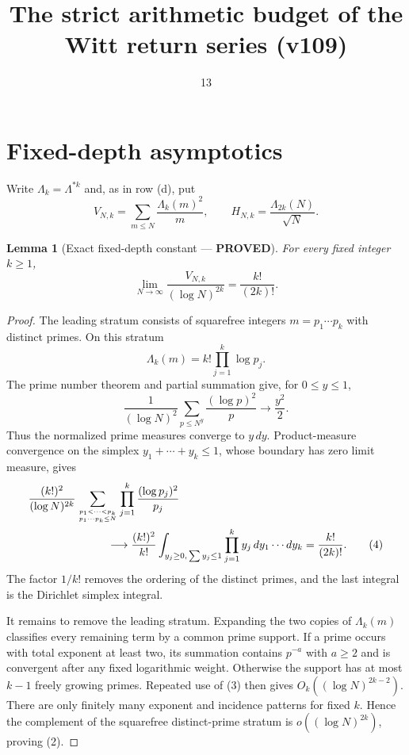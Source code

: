 \documentclass[11pt]{article}
\title{The strict arithmetic budget of the Witt return series (v109)}
\date{13}
\newcommand{\PROVED}{\textcolor{green!40!black}{\textbf{PROVED}}}
\newtheorem{lemma}{Lemma}
\begin{document}
\maketitle

\section{Fixed-depth asymptotics}

Write $\Lambda_k=\Lambda^{*k}$ and, as in row (d), put
\begin{equation}
 V_{N,k}=\sum_{m\le N}\frac{\Lambda_k(m)^2}{m},
 \qquad H_{N,k}=\frac{\Lambda_{2k}(N)}{\sqrt N}.                \tag{1}
\end{equation}

\begin{lemma}[Exact fixed-depth constant --- \PROVED]
For every fixed integer $k\ge1$,
\begin{equation}
 \boxed{
 \lim_{N\to\infty}\frac{V_{N,k}}{(\log N)^{2k}}
       =\frac{k!}{(2k)!}.}                                    \tag{2}
\end{equation}
\end{lemma}

\begin{proof}
The leading stratum consists of squarefree integers
$m=p_1\cdots p_k$ with distinct primes.  On this stratum
\[
 \Lambda_k(m)=k!\prod_{j=1}^k\log p_j.
\]
The prime number theorem and partial summation give, for $0\le y\le1$,
\begin{equation}
 \frac1{(\log N)^2}\sum_{p\le N^y}\frac{(\log p)^2}{p}
       \longrightarrow\frac{y^2}{2}.                          \tag{3}
\end{equation}
Thus the normalized prime measures converge to $y\,dy$.  Product-measure
convergence on the simplex $y_1+\cdots+y_k\le1$, whose boundary has zero
limit measure, gives
\begin{align*}
 &\frac{(k!)^2}{(\log N)^{2k}}
 \sum_{p_1<\cdots<p_k\atop p_1\cdots p_k\le N}
       \prod_{j=1}^k\frac{(\log p_j)^2}{p_j}\\
 &\hspace{25mm}\longrightarrow
 \frac{(k!)^2}{k!}
 \int_{y_j\ge0,\,\sum y_j\le1}\prod_{j=1}^ky_j\,dy_1\cdots dy_k
 =\frac{k!}{(2k)!}.                                           \tag{4}
\end{align*}
The factor $1/k!$ removes the ordering of the distinct primes, and the last
integral is the Dirichlet simplex integral.

It remains to remove the leading stratum.  Expanding the two copies of
$\Lambda_k(m)$ classifies every remaining term by a common prime support.
If a prime occurs with total exponent at least two, its summation contains
$p^{-a}$ with $a\ge2$ and is convergent after any fixed logarithmic weight.
Otherwise the support has at most $k-1$ freely growing primes.  Repeated
use of (3) then gives $O_k((\log N)^{2k-2})$.  There are only finitely many
exponent and incidence patterns for fixed $k$.  Hence the complement of
the squarefree distinct-prime stratum is $o((\log N)^{2k})$, proving (2).
\end{proof}
\end{document}
